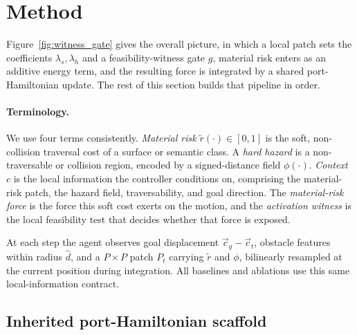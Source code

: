 
\section{Method}
\label{sec:method}

Figure~\ref{fig:witness_gate} gives the overall picture, in which a local patch sets the
coefficients $\lambda_s,\lambda_h$ and a feasibility-witness gate $g$, material
risk enters as an additive energy term, and the resulting force is integrated by
a shared port-Hamiltonian update. The rest of this section builds that pipeline
in order.

\paragraph{Terminology.} We use four terms consistently. \emph{Material risk} $\tilde r(\cdot)\in[0,1]$ is the soft, non-collision traversal cost of a surface or semantic class. A \emph{hard hazard} is a non-traversable or collision region, encoded by a signed-distance field $\phi(\cdot)$. \emph{Context} $c$ is the local information the controller conditions on, comprising the material-risk patch, the hazard field, traversability, and goal direction. The \emph{material-risk force} is the force this soft cost exerts on the motion, and the \emph{activation witness} is the local feasibility test that decides whether that force is exposed.

At each step the agent observes goal displacement $\vec c_g-\vec c_t$, obstacle features within radius $\hat d$, and a $P\times P$ patch $P_t$ carrying $\tilde r$ and $\phi$, bilinearly resampled at the current position during integration. All baselines and ablations use this same local-information contract.
 
\subsection{Inherited port-Hamiltonian scaffold}
\label{sec:method:skeleton}

